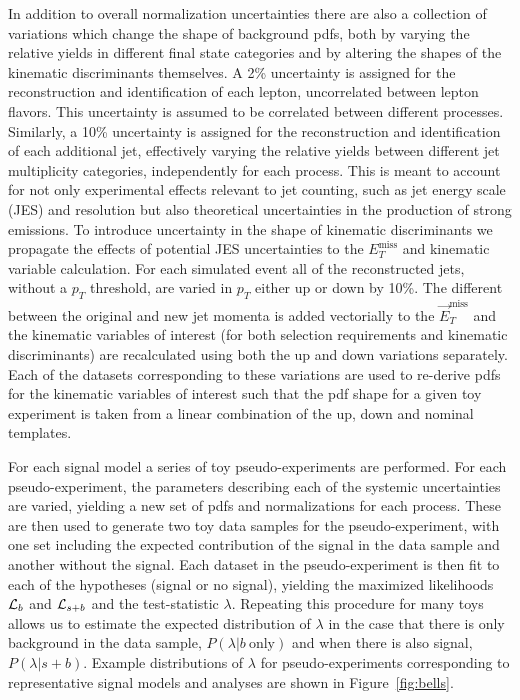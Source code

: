 In addition to overall normalization uncertainties there are also a collection of variations which change the shape of background pdfs, both by varying the relative yields in different final state categories and by altering the shapes of the kinematic discriminants themselves. A 2\% uncertainty is assigned for the reconstruction and identification of each lepton, uncorrelated between lepton flavors.  This uncertainty is assumed to be correlated between different processes. Similarly, a 10\% uncertainty is assigned for the reconstruction and identification of each additional jet, effectively varying the relative yields between different jet multiplicity categories, independently for each process. This is meant to account for not only experimental effects relevant to jet counting, such as jet energy scale (JES) and resolution but also theoretical uncertainties in the production of strong emissions. To introduce uncertainty in the shape of kinematic discriminants we propagate the effects of potential JES uncertainties to the $E_{T}^\text{miss}$ and kinematic variable calculation. For each simulated event all of the reconstructed jets, without a $p_{T}$ threshold, are varied in $p_{T}$ either up or down by 10\%. The different between the original and new jet momenta is added vectorially to the $\vec{E}_{T}^\text{miss}$ and the kinematic variables of interest (for both selection requirements and kinematic discriminants) are recalculated using both the up and down variations separately. Each of the datasets corresponding to these variations are used to re-derive pdfs for the kinematic variables of interest such that the pdf shape for a given toy experiment is taken from a linear combination of the up, down and nominal templates. 

For each signal model a series of toy pseudo-experiments are performed. For each pseudo-experiment, the parameters describing each of the systemic uncertainties are varied, yielding a new set of pdfs and normalizations for each process. These are then used to generate two toy data samples for the pseudo-experiment, with one set including the expected contribution of the signal in the data sample and another without the signal. Each dataset in the pseudo-experiment is then fit to each of the hypotheses (signal or no signal), yielding the maximized likelihoods ${\cal L}_{b}$ and ${\cal L}_{s+b}$ and the test-statistic $\lambda$. Repeating this procedure for many toys allows us to estimate the expected distribution of $\lambda$ in the case that there is only background in the data sample, $P(\lambda | b~\mathrm{only})$ and when there is also signal, $P(\lambda | s+b)$. Example distributions of $\lambda$ for pseudo-experiments corresponding to representative signal models and analyses are shown in Figure~\ref{fig:bells}.

